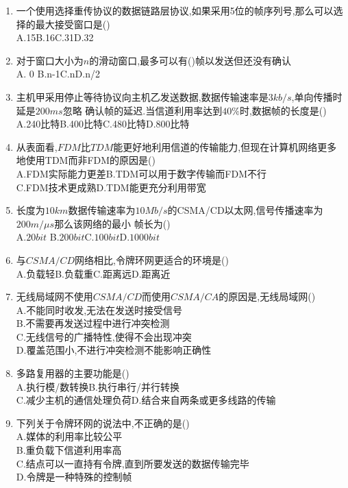 \documentclass[12pt, a4paper, oneside, UTF8]{ctexbook}
\begin{document}
\begin{enumerate}
    \item 一个使用选择重传协议的数据链路层协议,如果采用5位的帧序列号,那么可以选择的最大接受窗口是() \\
    A.15\qquad B.16\qquad C.31\qquad D.32

    \item 对于窗口大小为$n$的滑动窗口,最多可以有()帧以发送但还没有确认 \\
    A. 0 \qquad B.n-1\qquad C.n\qquad D.n/2 

    \item \bt[1] 主机甲采用停止等待协议向主机乙发送数据,数据传输速率是$3kb/s$,单向传播时延是$200ms$忽略
    确认帧的延迟.当信道利用率达到$40\%$时,数据帧的长度是() \\
    A.240比特\qquad B.400比特\qquad C.480比特\qquad D.800比特

    \item 从表面看,$FDM$比$TDM$能更好地利用信道的传输能力,但现在计算机网络更多地使用TDM而非FDM的原因是() \\
    A.FDM实际能力更差\qquad B.TDM可以用于数字传输而FDM不行 \\
    C.FDM技术更成熟\qquad D.TDM能更充分利用带宽

    \item 长度为$10km$数据传输速率为$10Mb/s$的CSMA/CD以太网,信号传播速率为$200m/\mu s$那么该网络的最小
    帧长为() \\
    A.$20bit$ \qquad B.$200bit$\qquad C.$100bit$\qquad D.$1000bit$
    
    \item 与$CSMA/CD$网络相比,令牌环网更适合的环境是() \\
    A.负载轻\qquad B.负载重\qquad C.距离远\qquad D.距离近

    \item 无线局域网不使用$CSMA/CD$而使用$CSMA/CA$的原因是,无线局域网() \\
    A.不能同时收发,无法在发送时接受信号 \\
    B.不需要再发送过程中进行冲突检测 \\
    C.无线信号的广播特性,使得不会出现冲突 \\
    D.覆盖范围小,不进行冲突检测不能影响正确性 

    \item 多路复用器的主要功能是() \\
    A.执行模/数转换\qquad B.执行串行/并行转换 \\
    C.减少主机的通信处理负荷\qquad D.结合来自两条或更多线路的传输 

    \item 下列关于令牌环网的说法中,不正确的是() \\
    A.媒体的利用率比较公平 \\
    B.重负载下信道利用率高 \\
    C.结点可以一直持有令牌,直到所要发送的数据传输完毕 \\
    D.令牌是一种特殊的控制帧 
    

\end{enumerate}
\end{document}
